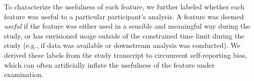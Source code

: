 To characterize the usefulness 
of each feature, 
we further labeled whether each 
feature was useful to a particular participant's analysis. 
A feature was deemed \textit{useful} 
if the feature was either used in a sensible 
and meaningful way during the study, 
or has envisioned usage outside of the constrained 
time limit during the study 
(e.g., if data was available or downstream analysis was conducted). 
We derived these labels from the study transcript 
to circumvent self-reporting bias, 
which can often artificially inflate 
the usefulness of the feature under examination. 
